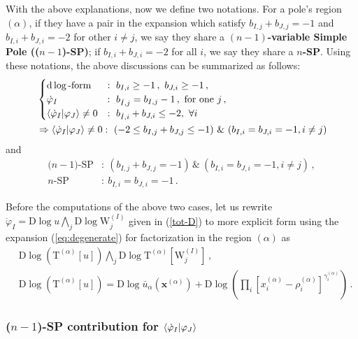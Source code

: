 \documentclass[a4paper,11pt]{article}
\newcommand{\nn}{\nonumber}
\newcommand{\nd}{\mathrm{d}}
\newcommand{\nD}{\mathrm{D}}
\newcommand{\nT}{\mathrm{T}}
\newcommand{\nW}{\mathrm{W}}
\def\eref#1{(\ref{#1})}
\begin{document}
With the above explanations, now we define two notations. For a pole's region $(\alpha)$, if they have a pair in the expansion which satisfy $b_{I,j}+b_{J,j} = -1$  and $b_{I,i}+b_{J,i} = -2$ for other  $i\neq j$, we say they share a {\bf $(n-1)$-variable Simple Pole (($n-1$)-SP)}; if  $b_{I,i}+b_{J,i} = -2$ for all $i$,  we say they share a {\bf $n$-SP}. Using these notations, the above discussions can be summarized as follows:
\begin{align}
&\begin{cases}
\nd \log \text{-form} &: \  b_{I,i}\geq-1 \, , \ b_{J,i}\geq-1 \, , \\
\dot{\varphi}_I &:\  b_{\dot{I},j} = b_{I,j}-1 \, , \ \text{for one $j$} \, , \\
\braket{\dot{\varphi}_I|\varphi_J}\neq 0 &: \ b_{\dot{I},i}+b_{J,i} \leq -2, ~\forall i 
\end{cases} \nn\\
&\Rightarrow \braket{\dot{\varphi}_I|\varphi_J}\neq 0 :\  (-2\leq b_{I,j}+b_{J,j} \leq -1) \  \& \  (b_{I,i}=b_{J,i} = -1, i\neq j)
\end{align}
and 
\begin{align}
\text{($n-1$)-SP} &: \ ( b_{I,j}+b_{J,j} = -1) \, \& \  (b_{I,i}=b_{J,i} = -1, i\neq j) \, , \nn\\
\text{$n$-SP} &:  \ b_{I,i}=b_{J,i} = -1 \, .
\end{align}

Before the computations of the above two cases, let us rewrite 
$\dot{\varphi}_I= \nD \log u \bigwedge_j \nD \log \nW^{(I)}_j$ given in \eref{tot-D} to more explicit form using the expansion \eref{eq:degenerate}
for factorization in the region $(\alpha)$ as  
\begin{align}
 &\nD \log \left( \nT^{(\alpha)} [u] \right) \bigwedge_j \nD \log \nT^{(\alpha)}\left[\nW^{(I)}_j \right] \, ,\nn\\
& \nD \log \left( \nT^{(\alpha)} [u] \right) = \nD \log \bar{u}_\alpha(\bm{x}^{(\alpha)}) + \nD \log \left(\prod_i \left[ x_i^{(\alpha)} - \rho_i^{(\alpha)} \right]^{\gamma_i^{(\alpha)}} \right) \,. \label{eq:TDlog}
\end{align}



\subsubsection{($n-1$)-SP contribution for $\braket{\dot{\varphi}_I|\varphi_J}$}
\end{document}

